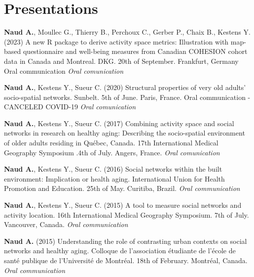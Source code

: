 \documentclass{resume}
\begin{document}
\section{Presentations}
\begin{content}
	
  	\publi
	{\textbf{Naud A.}, Moullec G., Thierry B., Perchoux C., Gerber P., Chaix B., Kestens Y. (2023) A new R package to derive activity space metrics: Illustration with map-based questionnaire and well-being measures from Canadian COHESION cohort data in Canada and Montreal. DKG. 20th of September. Frankfurt, Germany Oral communication \textit{Oral comunication}}


	\publi
	{\textbf{Naud A.}, Kestens Y., Sueur C. (2020) Structural properties of very old adults’ socio-spatial networks. Sunbelt. 5th of June. Paris,
	France. Oral communication - CANCELED COVID-19 \textit{Oral comunication}}


	\publi
	{\textbf{Naud A.}, Kestens Y., Sueur C. (2017) Combining activity space and social networks in research on healthy aging: Describing the socio-spatial environment of older adults residing in Québec, Canada. 17th  International Medical Geography Symposium .4th of July. Angers, France. \textit{Oral comunication}}


	\publi
	{\textbf{Naud A.}, Kestens Y., Sueur C. (2016) Social networks within the built environment: Implication or health aging. International Union for Health Promotion and Education. 25th of May. Curitiba, Brazil. \textit{Oral communication}}
 

	\publi
	{\textbf{Naud A.}, Kestens Y., Sueur C. (2015) A tool to measure social networks and activity location. 16th International Medical Geography Symposium. 7th of July. Vancouver, Canada. \textit{Oral communication}}


	\publi
	{\textbf{Naud A.} (2015) Understanding the role of contrasting urban contexts on social networks and healthy aging. Colloque de l’association étudiante de l’école de santé publique de l’Université de Montréal. 18th of February. Montréal, Canada. \textit{Oral communication} }

	
\end{content}

\end{document}
